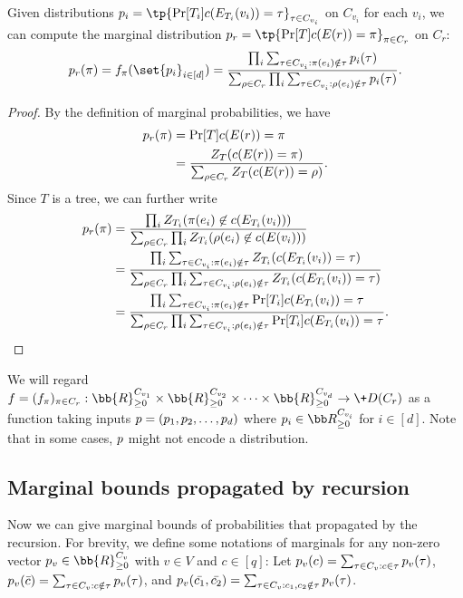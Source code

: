 \documentclass[a4paper,11pt]{article}
\begin{document}
\begin{lemma}\label{lem:tree-recursion}
    Given distributions $\*{p}_i=\tp{\Pr[T_i]{c(E_{T_i}(v_i))=\tau}}_{\tau\in C_{v_i}}$ on $C_{v_i}$ for each $v_i$, we can compute the marginal distribution $\*{p}_r=\tp{\Pr[T]{c(E(r))=\pi}}_{\pi \in C_r}$ on $C_r$:
\begin{align*}
    \*p_r(\pi)=f_\pi(\set{\*{p}_i}_{i\in [d]})=\frac{\prod_i \sum_{\tau
    \in C_{v_i}: \pi(e_i)\notin \tau} \*p_{i}(\tau)}{\sum_{\rho \in C_r} \prod_i \sum_{\tau
    \in C_{v_i}: \rho(e_i)\notin \tau} \*p_{i}(\tau)}.
\end{align*}
\end{lemma}
\begin{proof}
    By the definition of marginal probabilities, we have
\begin{align*}
    \*p_r(\pi)&=\Pr[T]{c(E(r))=\pi}\\
    &=\frac{Z_T(c(E(r))=\pi)}{\sum_{\rho \in C_r} Z_T(c(E(r))=\rho)}.
\end{align*}
Since $T$ is a tree, we can further write 
\begin{align*}
    \*p_r(\pi)&=\frac{\prod_i Z_{T_i}(\pi(e_i)\not\in c(E_{T_i}(v_i)))}{\sum_{\rho \in C_r} \prod_i Z_{T_i}(\rho(e_i)\not\in c(E(v_i)))}\\
    &=\frac{\prod_i \sum_{\tau
    \in C_{v_i} : \pi(e_i)\notin \tau} Z_{T_i}(c(E_{T_i}(v_i))=\tau)}{\sum_{\rho \in C_r} \prod_i \sum_{\tau
    \in C_{v_i}: \rho(e_i)\notin \tau} Z_{T_i}(c(E_{T_i}(v_i))=\tau)}\\
    &=\frac{\prod_i \sum_{\tau
    \in C_{v_i}: \pi(e_i)\notin \tau} \Pr[T_i]{c(E_{T_i}(v_i))=\tau}}{\sum_{\rho \in C_r} \prod_i \sum_{\tau
    \in C_{v_i}: \rho(e_i)\notin \tau} \Pr[T_i]{c(E_{T_i}(v_i))=\tau}}.
\end{align*}
\end{proof}
We will regard $f=(f_\pi)_{\pi \in C_r}: \bb{R}_{\geq 0}^{C_{v_1}}\times \bb{R}_{\geq 0}^{C_{v_2}}\times \cdots \times \bb{R}_{\geq 0}^{C_{v_d}} \rightarrow \+D(C_{r})$ as a function taking inputs $\*p = (\*p_1, \*p_2, \dots, \*p_d)$ where $\*p_i\in \bb R_{\ge 0}^{C_{v_i}}$ for $i\in [d]$. Note that in some cases, $\*p$ might not encode a distribution.

\subsection{Marginal bounds propagated by recursion}\label{sec:marginal_bounds_on_trees}
Now we can give marginal bounds of probabilities that propagated by the recursion. For brevity, we define some notations of marginals for any non-zero vector $\*p_v\in \bb{R}_{\geq 0}^{C_v}$ with $v\in V$ and $c\in [q]$: Let $\*p_v(c)=\sum_{\tau \in C_v:c \in \tau} \*p_v(\tau)$, $\*p_v(\bar{c})=\sum_{\tau \in C_v:c \notin \tau} \*p_v(\tau)$, and $\*p_v(\bar{c_1},\bar{c_2})=\sum_{\tau \in C_v:c_1,c_2 \notin \tau} \*p_v(\tau)$.
\end{document}
